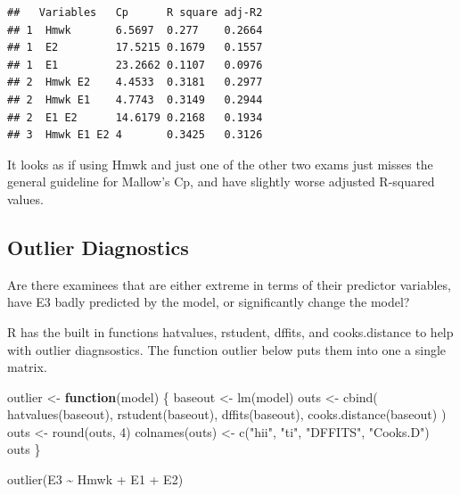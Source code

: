 \documentclass[
]{book}
\newenvironment{Shaded}{\begin{snugshade}}{\end{snugshade}}
\newcommand{\ControlFlowTok}[1]{\textcolor[rgb]{0.13,0.29,0.53}{\textbf{#1}}}
\newcommand{\DecValTok}[1]{\textcolor[rgb]{0.00,0.00,0.81}{#1}}
\newcommand{\FunctionTok}[1]{\textcolor[rgb]{0.00,0.00,0.00}{#1}}
\newcommand{\NormalTok}[1]{#1}
\newcommand{\OtherTok}[1]{\textcolor[rgb]{0.56,0.35,0.01}{#1}}
\newcommand{\SpecialCharTok}[1]{\textcolor[rgb]{0.00,0.00,0.00}{#1}}
\newcommand{\StringTok}[1]{\textcolor[rgb]{0.31,0.60,0.02}{#1}}
\begin{document}
\begin{verbatim}
##   Variables   Cp      R square adj-R2
## 1  Hmwk       6.5697  0.277    0.2664
## 1  E2         17.5215 0.1679   0.1557
## 1  E1         23.2662 0.1107   0.0976
## 2  Hmwk E2    4.4533  0.3181   0.2977
## 2  Hmwk E1    4.7743  0.3149   0.2944
## 2  E1 E2      14.6179 0.2168   0.1934
## 3  Hmwk E1 E2 4       0.3425   0.3126
\end{verbatim}

It looks as if using Hmwk and just one of the other two exams just misses the general guideline for Mallow's Cp, and have slightly worse adjusted R-squared values.

\hypertarget{outlier-diagnostics}{%
\subsection{Outlier Diagnostics}\label{outlier-diagnostics}}

Are there examinees that are either extreme in terms of their predictor variables, have E3 badly predicted by the model, or significantly change the model?

R has the built in functions hatvalues, rstudent, dffits, and cooks.distance to help with outlier diagnsostics. The function outlier below puts them into one a single matrix.

\begin{Shaded}
\begin{Highlighting}[]
\NormalTok{outlier }\OtherTok{\textless{}{-}} \ControlFlowTok{function}\NormalTok{(model) \{}
\NormalTok{  baseout }\OtherTok{\textless{}{-}} \FunctionTok{lm}\NormalTok{(model)}
\NormalTok{  outs }\OtherTok{\textless{}{-}} \FunctionTok{cbind}\NormalTok{(}
    \FunctionTok{hatvalues}\NormalTok{(baseout), }\FunctionTok{rstudent}\NormalTok{(baseout),}
    \FunctionTok{dffits}\NormalTok{(baseout), }\FunctionTok{cooks.distance}\NormalTok{(baseout)}
\NormalTok{  )}
\NormalTok{  outs }\OtherTok{\textless{}{-}} \FunctionTok{round}\NormalTok{(outs, }\DecValTok{4}\NormalTok{)}
  \FunctionTok{colnames}\NormalTok{(outs) }\OtherTok{\textless{}{-}} \FunctionTok{c}\NormalTok{(}\StringTok{"hii"}\NormalTok{, }\StringTok{"ti"}\NormalTok{, }\StringTok{"DFFITS"}\NormalTok{, }\StringTok{"Cooks.D"}\NormalTok{)}
\NormalTok{  outs}
\NormalTok{\}}

\FunctionTok{outlier}\NormalTok{(E3 }\SpecialCharTok{\textasciitilde{}}\NormalTok{ Hmwk }\SpecialCharTok{+}\NormalTok{ E1 }\SpecialCharTok{+}\NormalTok{ E2)}
\end{Highlighting}
\end{Shaded}
\end{document}
